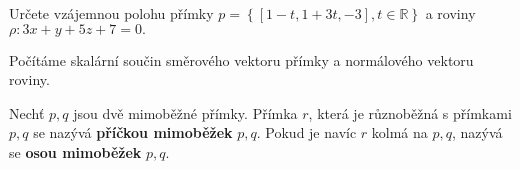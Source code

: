 \begin{priklad}
Určete vzájemnou polohu přímky $p=\left \{ [1-t,1+3t,-3],t \in \mathbb R \right \} $ a
roviny $\rho:3x+y+5z+7=0.$
\end{priklad}

\begin{reseni}
Počítáme skalární součin směrového vektoru přímky a normálového vektoru roviny.
\end{reseni}

\begin{definition}
Nechť $p,q$ jsou dvě mimoběžné přímky. Přímka $r$, která je různoběžná s přímkami
$p,q$ se nazývá \textbf{příčkou mimoběžek} $p,q$. Pokud je navíc $r$ kolmá na $p,q$,
nazývá se \textbf{osou mimoběžek} $p,q$.
\end{definition}
